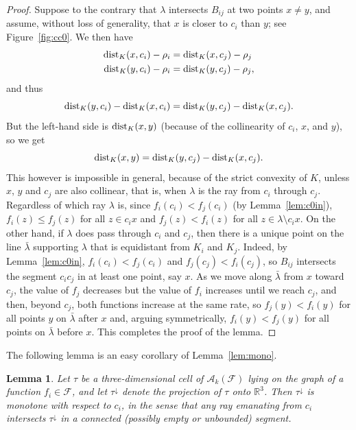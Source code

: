 \documentclass[11pt]{article}
\def\reals{{\mathbb R}}
\def\dist{{\rm dist}}
\def\A{\mathcal{A}}
\def\F{\mathcal{F}}
\newtheorem{lemma}[theorem]{Lemma}
\theoremstyle{definition}
\begin{document}
\begin{proof}
Suppose to the contrary that $\lambda$ intersects $B_{ij}$ at 
two points $x\ne y$, and assume, without loss of generality, that $x$ is closer to 
$c_i$ than $y$; see Figure~\ref{fig:cc0}. We then have
\begin{align*}
\dist_K(x,c_i) - \rho_i & = \dist_K(x,c_j) - \rho_j \\
\dist_K(y,c_i) - \rho_i & = \dist_K(y,c_j) - \rho_j ,
\end{align*}
and thus
\[
\dist_K(y,c_i) - \dist_K(x,c_i) = \dist_K(y,c_j) - \dist_K(x,c_j) .
\]
But the left-hand side is $\dist_K(x,y)$ (because of the collinearity of $c_i$, $x$, and $y$), so we get
\[
\dist_K(x,y) = \dist_K(y,c_j) - \dist_K(x,c_j) .
\]
This however is impossible in general, because of the strict convexity of $K$, unless $x$, $y$ and $c_j$ 
are also collinear, that is, when $\lambda$ is the ray from $c_i$ through $c_j$. 
Regardless of which ray $\lambda$ is, since $f_i(c_i) < f_j(c_i)$ (by Lemma~\ref{lem:c0in}), 
$f_i(z) \le f_j(z)$ for all $z\in c_i x$ and $f_j (z) < f_i(z)$ for all $z\in\lambda\setminus c_ix$.
%
On the other hand, if $\lambda$ does pass through $c_i$ and $c_j$, then there is a unique point 
on the line $\bar\lambda$ supporting $\lambda$ that is equidistant from $K_i$ and $K_j$. 
	Indeed, by Lemma~\ref{lem:c0in}, $f_i(c_i) < f_j(c_i)$ and $f_j(c_j) < f_i(c_j)$,
so $B_{ij}$ intersects the segment $c_ic_j$ in at least one point, say $x$. As we 
move along $\bar\lambda$ from  $x$ toward $c_j$, the value of $f_j$ decreases but the value of 
$f_i$ increases until we reach $c_j$, and then, beyond $c_j$, both functions increase at the 
same rate, so $f_j(y)< f_i(y)$ for all points $y$ on $\bar\lambda$ after $x$ and, arguing symmetrically, 
$f_i(y)<f_j(y)$ for all points on $\bar\lambda$ before $x$. This completes the proof of the lemma.
\end{proof}
%
The following lemma is an easy corollary of Lemma~\ref{lem:mono}.
\begin{lemma}
	\label{lem:star} 
	Let $\tau$ be a three-dimensional cell of $\A_{k}(\F)$
	lying on the graph of a function $f_i\in\F$, and let $\tau^\downarrow$ 
	denote the projection of $\tau$ onto $\reals^3$.  Then $\tau^\downarrow$ is 
	monotone with respect to $c_i$, in the sense that any ray emanating from 
	$c_i$ intersects $\tau^\downarrow$ in a connected (possibly empty or 
	unbounded) segment.
\end{lemma}
\end{document}
